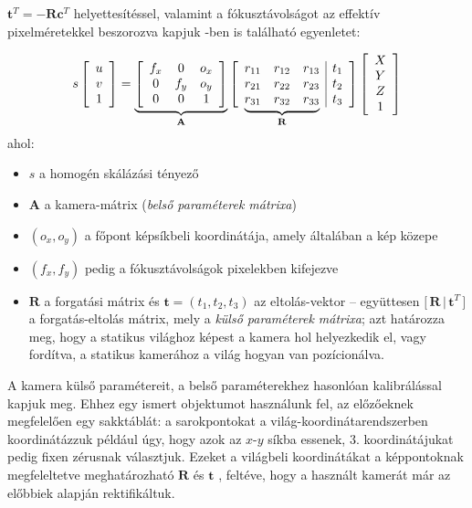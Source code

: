 $\mathbf{t}^T = -\mathbf{R}\mathbf{c}^T$ helyettesítéssel, valamint a fókusztávolságot az effektív pixelméretekkel beszorozva kapjuk \cite{camera-calib}-ben is található egyenletet:

\[s \left[\begin{array}{c}
u \\ 
v \\
1
\end{array}\right] = \underbrace{\left[\begin{array}{ccc}
f_x & 0 & o_x \\ 
0 & f_y & o_y \\
0 & 0 & 1
\end{array}\right]}_{\mathbf{A}} \left[\begin{array}{ccc|cc}
r_{11} & r_{12} & r_{13} & t_1 \\ 
r_{21} & r_{22} & r_{23} & t_2 \\
\undermat{\mathbf{R}}{r_{31} & r_{32} & r_{33}} & t_3 \\
\end{array}\right] \left[\begin{array}{c}
X \\ 
Y \\
Z \\
1
\end{array}\right]\]
ahol:
\begin{itemize}[itemsep=0pt]
\item $s$ a homogén skálázási tényező
\item $\mathbf{A}$ a kamera-mátrix (\textit{belső paraméterek mátrixa})
\item $(o_x, o_y)$ a főpont képsíkbeli koordinátája, amely általában a kép közepe
\item $(f_x, f_y)$ pedig a fókusztávolságok pixelekben kifejezve
\item $\mathbf{R}$ a forgatási mátrix és $\mathbf{t} = (t_1, t_2, t_3)$ az eltolás-vektor -- együttesen $\Big[\,\mathbf{R}\,|\,\mathbf{t}^T\,\Big]$ a forgatás-eltolás mátrix, mely a \textit{külső paraméterek mátrixa}; azt határozza meg, hogy a statikus világhoz képest a kamera hol helyezkedik el, vagy fordítva, a statikus kamerához a világ hogyan van pozícionálva.
\end{itemize}

A kamera külső paramétereit, a belső paraméterekhez hasonlóan kalibrálással kapjuk meg. Ehhez egy ismert objektumot használunk fel, az előzőeknek megfelelően egy sakktáblát: a sarokpontokat a világ-koordinátarend\-szerben koordinátázzuk például úgy, hogy azok az $x$-$y$ síkba essenek, 3. koordinátájukat pedig fixen zérusnak választjuk. Ezeket a világbeli koordinátákat a képpontoknak megfeleltetve meghatározható $\mathbf{R}$ és $\mathbf{t}$ \cite{camera-calib}, feltéve, hogy a használt kamerát már az előbbiek alapján rektifikáltuk.

